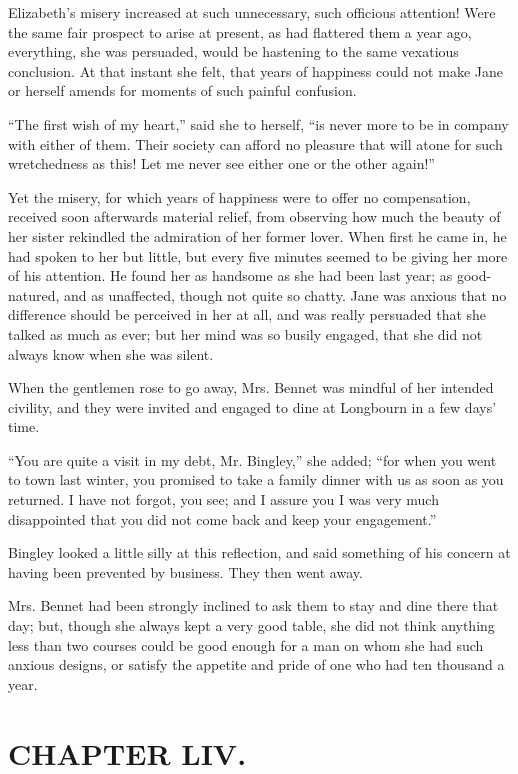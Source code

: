 Elizabeth's misery increased at such unnecessary, such officious attention! Were the same fair prospect to arise at present, as had flattered them a year ago, everything, she was persuaded, would be hastening to the same vexatious conclusion. At that instant she felt, that years of happiness could not make Jane or herself amends for moments of such painful confusion.

``The first wish of my heart,'' said she to herself, ``is never more to be in company with either of them. Their society can afford no pleasure that will atone for such wretchedness as this! Let me never see either one or the other again!''

Yet the misery, for which years of happiness were to offer no compensation, received soon afterwards material relief, from observing how much the beauty of her sister rekindled the admiration of her former lover. When first he came in, he had spoken to her but little, but every five minutes seemed to be giving her more of his attention. He found her as handsome as she had been last year; as good-natured, and as unaffected, though not quite so chatty. Jane was anxious that no difference should be perceived in her at all, and was really persuaded that she talked as much as ever; but her mind was so busily engaged, that she did not always know when she was silent.

When the gentlemen rose to go away, Mrs. Bennet was mindful of her intended civility, and they were invited and engaged to dine at Longbourn in a few days' time.

``You are quite a visit in my debt, Mr. Bingley,'' she added; ``for when you went to town last winter, you promised to take a family dinner with us as soon as you returned. I have not forgot, you see; and I assure you I was very much disappointed that you did not come back and keep your engagement.''

Bingley looked a little silly at this reflection, and said something of his concern at having been prevented by business. They then went away.

Mrs. Bennet had been strongly inclined to ask them to stay and dine there that day; but, though she always kept a very good table, she did not think anything less than two courses could be good enough for a man on whom she had such anxious designs, or satisfy the appetite and pride of one who had ten thousand a year.



\chapter{CHAPTER LIV.}

